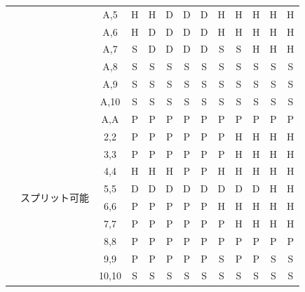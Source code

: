 \begin{table}[H]
\begin{center}
\begin{tabular}{|c|c|c|c|c|c|c|c|c|c|c|c|c|}
                            &                           & A,5   & H & H & D & D & D & H & H & H & H  & H \\ \cline{3-13} 
                            &                           & A,6   & H & D & D & D & D & H & H & H & H  & H \\ \cline{3-13} 
                            &                           & A,7   & S & D & D & D & D & S & S & H & H  & H \\ \cline{3-13} 
                            &                           & A,8   & S & S & S & S & S & S & S & S & S  & S \\ \cline{3-13} 
                            &                           & A,9   & S & S & S & S & S & S & S & S & S  & S \\ \cline{3-13} 
                            &                           & A,10  & S & S & S & S & S & S & S & S & S  & S \\ \cline{2-13} 
                            & \multirow{10}{*}{スプリット可能} & A,A   & P & P & P & P & P & P & P & P & P  & P \\ \cline{3-13} 
                            &                           & 2,2   & P & P & P & P & P & P & H & H & H  & H \\ \cline{3-13} 
                            &                           & 3,3   & P & P & P & P & P & P & H & H & H  & H \\ \cline{3-13} 
                            &                           & 4,4   & H & H & H & P & P & H & H & H & H  & H \\ \cline{3-13} 
                            &                           & 5,5   & D & D & D & D & D & D & D & D & H  & H \\ \cline{3-13} 
                            &                           & 6,6   & P & P & P & P & P & H & H & H & H  & H \\ \cline{3-13} 
                            &                           & 7,7   & P & P & P & P & P & P & H & H & H  & H \\ \cline{3-13} 
                            &                           & 8,8   & P & P & P & P & P & P & P & P & P  & P \\ \cline{3-13} 
                            &                           & 9,9   & P & P & P & P & P & S & P & P & S  & S \\ \cline{3-13} 
                            &                           & 10,10 & S & S & S & S & S & S & S & S & S  & S \\ \hline
    \end{tabular}
    \end{center}
\end{table}


